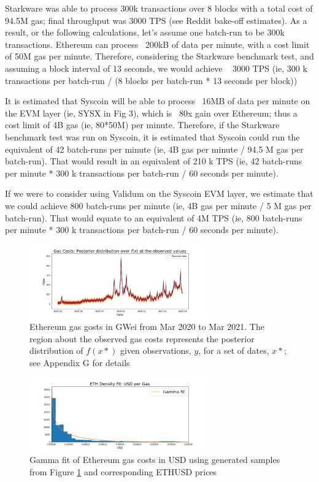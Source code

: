 \documentclass[peerreview]{ieeesyscoin}
\begin{document}
Starkware was able to process 300k transactions over 8 blocks with a total cost of 94.5M gas; final throughput was 3000 TPS (see Reddit bake-off estimates). As a result, or the following calculations, let’s assume one batch-run to be 300k transactions.
Ethereum can process ~200kB of data per minute, with a cost limit of 50M gas per minute. Therefore, considering the Starkware benchmark test, and assuming a block interval of 13 seconds, we would achieve ~ 3000 TPS (ie,  300 k transactions per batch-run / (8 blocks per batch-run * 13 seconds per block))

It is estimated that Syscoin will be able to process ~16MB of data per minute on the EVM layer (ie, SYSX in Fig 3), which is ~80x gain over Ethereum; thus a cost limit of 4B gas (ie, 80*50M) per minute. Therefore, if the Starkware benchmark test was run on Syscoin, it is estimated that Syscoin could run the equivalent of 42 batch-runs per minute (ie, 4B gas per minute / 94.5 M gas per batch-run). That would result in an equivalent of 210 k TPS (ie, 42 batch-runs per minute * 300 k transactions per batch-run / 60 seconds per minute).

If we were to consider using Validum on the Syscoin EVM layer, we estimate that we could achieve 800 batch-runs per minute (ie, 4B gas per minute / 5 M gas per batch-run). That would equate to an equivalent of 4M TPS (ie, 800 batch-runs per minute * 300 k transactions per batch-run / 60 seconds per minute).

\begin{figure}[h!]
\includegraphics[width=3in]{img/eth_gas_costs.png}
\caption{Ethereum gas gosts in GWei from Mar 2020 to Mar 2021. The region about the observed gas costs represents the posterior distribution of $f(x*)$ given observations, $y$, for a set of dates, $x*$; see Appendix G for details}  
\label{fig:eth_gas_costs}
\end{figure} 

\begin{figure}[h!]
\includegraphics[width=3in]{img/eth_usd_density.png}
\caption{Gamma fit of Ethereum gas costs in USD using generated samples from Figure \ref{fig:eth_gas_costs} and corresponding ETHUSD prices} 
\label{fig:eth_usd_density}
\end{figure} 
\end{document}

